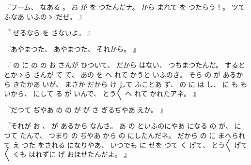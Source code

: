 %
『フーム、
%
なある
。
%
お
が
を
つたんだナ。
%
から
まれて
を
つたらう！。
%
ツて
ふなあ
いふのゝ
だぜ。
』

%
『
ぜるなら
を
さないよ。
』

%
『あやまつた、
あやまつた、
%
それから。
』

%
『
の
に
の
の
お
さんが
ひついて、
%
だから
はない、
%
つちまつたんだ。
%
すると
とかゝら
さんが
て
て、
%
あの
を
へ
れて
かうと
いふのさ。
%
そら
の
が
あるから
きたかあ
いが、
%
まさか
だから
け
して
ふことあ
ず、
%
の
に
は
し、
%
に
も
も
%
いから、
%
にして
る
が
いんで、
%
とう〳〵
へ
れて
かれたアネ。
』

%
『だつて
ぢやあ
の
の
が
が
さ
ぎるぢやあ
えか。
』

%
『それが
お
、
%
が
あるから
なんさ。
%
あ
の
といふのにやあ
になる
の
が、
%
に
つて
たんで、
%
つまり
の
ぢやあ
から
の
にしたんだネ。
%
だから
の
に
まへられて
え
つた
をされる
になりやあ、
%
いつでも
に
%
せを
つて
く
げて、
%
とう〳〵
げて〳〵
くも
はれずに
げ
おほせたんだよ。
』

